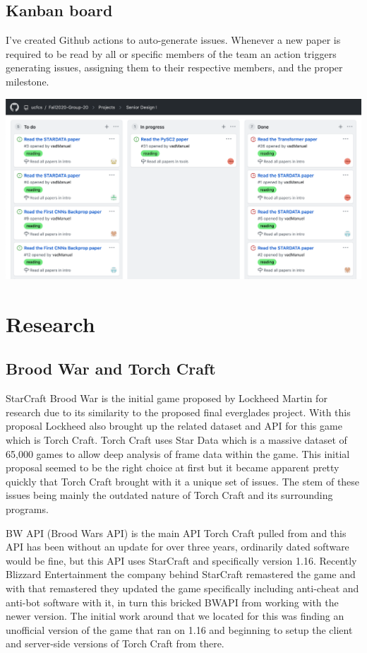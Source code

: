 \documentclass[a4paper,12pt]{report}
\begin{document}
\section{Kanban board}

I've created Github actions to auto-generate issues. Whenever a new paper is required to be read by all or specific members of the team an action triggers generating issues, assigning them to their respective members, and the proper milestone. 

\begin{center}
    \captionsetup{type=figure}
    \includegraphics[width=.8\linewidth]{media/kanban.png}
\end{center}

\chapter{Research}
\section{Brood War and Torch Craft}

StarCraft Brood War is the initial game proposed by Lockheed Martin for research due to its similarity to the proposed final everglades project. With this proposal Lockheed also brought up the related dataset and API for this game which is Torch Craft. Torch Craft uses Star Data which is a massive dataset of 65,000 games to allow deep analysis of frame data within the game. This initial proposal seemed to be the right choice at first but it became apparent pretty quickly that Torch Craft brought with it a unique set of issues. The stem of these issues being mainly the outdated nature of Torch Craft and its surrounding programs.

BW API (Brood Wars API) is the main API Torch Craft pulled from and this API has been without an update for over three years, ordinarily dated software would be fine, but this API uses StarCraft and specifically version 1.16. Recently Blizzard Entertainment the company behind StarCraft remastered the game and with that remastered they updated the game specifically including anti-cheat and anti-bot software with it, in turn this bricked BWAPI from working with the newer version. The initial work around that we located for this was finding an unofficial version of the game that ran on 1.16 and beginning to setup the client and server-side versions of Torch Craft from there. 
\end{document}
